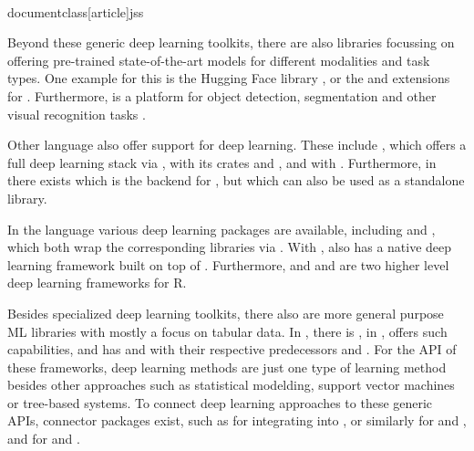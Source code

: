 \\documentclass[article]{jss}
\theoremstyle{definition}
\begin{document}
Beyond these generic deep learning toolkits, there are also libraries focussing on offering pre-trained state-of-the-art models for different modalities and task types.
One example for this is the Hugging Face  library \citep{ref-wolf-etal-2020-transformers}, or the  \citep{ref-marcel2010torchvision} and  \citep{ref-yang2022torchaudio} extensions for \pytorch.
Furthermore,  is a platform for object detection, segmentation and other visual recognition tasks \citep{ref-wu2019detectron2}.

Other language also offer support for deep learning.
These include  \citep{ref-bezanson2017julia}, which offers a full deep learning stack via \flux{} \citep{ref-innes2018flux}, \rust{} \citep{ref-matsakis2014rust} with its crates  \citep{ref-burn} and  \citep{ref-candle}, and  \citep{ref-go} with  \citep{ref-gomlx}.
Furthermore, in \cpp{} there exists  which is the \cpp{} backend for \pytorch{}, but which can also be used as a standalone \cpp{} library.

In the  \citep{ref-R-base} language various deep learning packages are available, including  \citep{ref-keras32025} and  \citep{ref-r-tensorflow2024}, which both wrap the corresponding \pytorch{} libraries via  \citep{ref-reticulate2025}.
With  \citep{ref-torch2025},  also has a native deep learning framework built on top of .
Furthermore,  \citep{ref-luz2023} and and  \citep{ref-cito2024} are two higher level deep learning frameworks for R.

Besides specialized deep learning toolkits, there also are more general purpose ML libraries with mostly a focus on tabular data.
In \python, there is \sklearn{} \citep{ref-pedregosa2011scikit-learn}, in \julia{},  \mlj{} \citep{ref-blaom2020mlj} offers such capabilities, and \rlang{} has \tidymodels{} \citep{ref-kuhn2020tidymodels} and  \citep{ref-mlr32019} with their respective predecessors  \citep{ref-kuhn2021caret} and  \citep{ref-bischl2016mlr}.
For the API of these frameworks, deep learning methods are just one type of learning method besides other approaches such as statistical modelding, support vector machines or tree-based systems.
To connect deep learning approaches to these generic APIs, connector packages exist, such as  \citep{ref-skorch} for integrating  into \sklearn{}, or similarly  \citep{ref-MLJFlux} for \flux{} and \mlj, and  \citep{ref-brulee2025} for \torch{} and \tidymodels.
\end{document}
